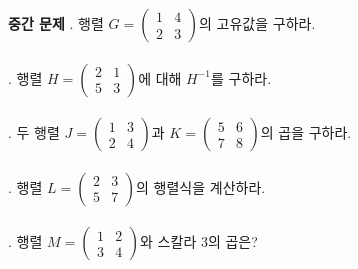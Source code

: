 \documentclass[fleqn]{article}
\begin{document}
\textbf{중간 문제}  
. 행렬 \( G = \begin{pmatrix} 1 & 4 \\ 2 & 3 \end{pmatrix} \)의 고유값을 구하라.  
\\\\  
. 행렬 \( H = \begin{pmatrix} 2 & 1 \\ 5 & 3 \end{pmatrix} \)에 대해 \( H^{-1} \)를 구하라.  
\\\\  
. 두 행렬 \( J = \begin{pmatrix} 1 & 3 \\ 2 & 4 \end{pmatrix} \)과 \( K = \begin{pmatrix} 5 & 6 \\ 7 & 8 \end{pmatrix} \)의 곱을 구하라.  
\\\\  
. 행렬 \( L = \begin{pmatrix} 2 & 3 \\ 5 & 7 \end{pmatrix} \)의 행렬식을 계산하라.  
\\\\  
. 행렬 \( M = \begin{pmatrix} 1 & 2 \\ 3 & 4 \end{pmatrix} \)와 스칼라 3의 곱은?  
\\\\  
\end{document}
